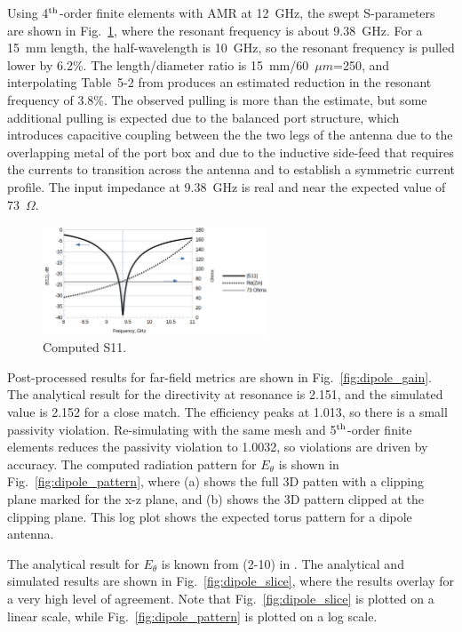 \documentclass[titlepage]{article}
\renewcommand\_{\textunderscore\linebreak[1]}
\begin{document}
Using 4$^{\textnormal{th}}$-order finite elements with AMR at 12~GHz, the swept S-parameters are shown in Fig.~\ref{fig:dipole_S}, where the resonant frequency is about 9.38~GHz.  For a 15~mm length, the half-wavelength is 10~GHz, so the resonant frequency is pulled lower by 6.2\%.  The length/diameter ratio is 15~mm/60~$\mu m$=250, and interpolating Table~5-2 from \cite{Stutzman-Thiele} produces an estimated reduction in the resonant frequency of 3.8\%. The observed pulling is more than the estimate, but some additional pulling is expected due to the balanced port structure, which introduces capacitive coupling between the the two legs of the antenna due to the overlapping metal of the port box and due to the inductive side-feed that requires the currents to transition across the antenna and to establish a symmetric current profile.  The input impedance at 9.38~GHz is real and near the expected value of 73~$\Omega$.

\begin{figure}[H]
  \centering
  \includegraphics[width=0.6\textwidth]{../regression/OpenParEM3D/antenna/dipole_study/screenshots/dipole_S}
  \caption{Computed S11.}
  \label{fig:dipole_S}
\end{figure}

Post-processed results for far-field metrics are shown in Fig.~\ref{fig:dipole_gain}.  The analytical result for the directivity at resonance is 2.151, and the simulated value is 2.152 for a close match.  The efficiency peaks at 1.013, so there is a small passivity violation.  Re-simulating with the same mesh and 5$^{\textnormal{th}}$-order finite elements reduces the passivity violation to 1.0032, so violations are driven by accuracy.  The computed radiation pattern for $E_\theta$ is shown in Fig.~\ref{fig:dipole_pattern}, where (a) shows the full 3D patten with a clipping plane marked for the x-z plane, and (b) shows the 3D pattern clipped at the clipping plane.  This log plot shows the expected torus pattern for a dipole antenna.

The analytical result for $E_\theta$ is known from (2-10) in \cite{Stutzman-Thiele}.  The analytical and simulated results are shown in Fig.~\ref{fig:dipole_slice}, where the results overlay for a very high level of agreement.  Note that Fig.~\ref{fig:dipole_slice} is plotted on a linear scale, while Fig.~\ref{fig:dipole_pattern} is plotted on a log scale.
\end{document}
